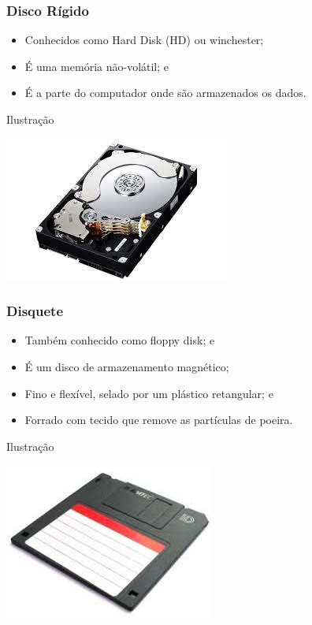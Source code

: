 \documentclass[aspectratio=169]{beamer} %
\begin{document}
\begin{frame}
	\frametitle{Disco Rígido}
		
	\begin{itemize}
		\item Conhecidos como Hard Disk (HD) ou winchester;
		\item É uma memória não-volátil; e
		\item É a parte do computador onde são armazenados os dados.
	\end{itemize}\vfill
	
	\begin{exampleblock}{Ilustra\c cão}
		\begin{center}
			\includegraphics[scale=0.4]{img/hd}
		\end{center}		
	\end{exampleblock}
\end{frame}

\begin{frame}
	\frametitle{Disquete}
		
	\begin{itemize}
		\item Também conhecido como floppy disk; e
		\item É um disco de armazenamento magnético;
		\item Fino e flexível, selado por um plástico retangular; e 
		\item Forrado com tecido que remove as partículas de poeira.
	\end{itemize}\vfill
	
	\begin{exampleblock}{Ilustra\c cão}
		\begin{center}
			\includegraphics[scale=0.4]{img/disquete}
		\end{center}
	\end{exampleblock}
\end{frame}
\end{document}
